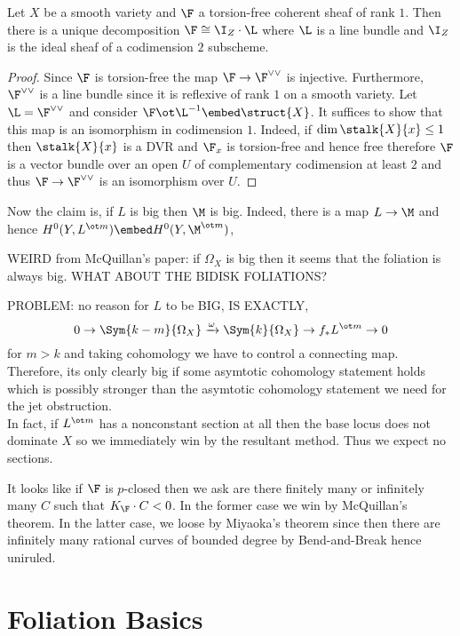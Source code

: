 \documentclass[12pt]{article}
\begin{document}
\begin{lemma}
Let $X$ be a smooth variety and $\F$ a torsion-free coherent sheaf of rank $1$. Then there is a unique decomposition $\F \cong \I_Z \cdot \L$ where $\L$ is a line bundle and $\I_Z$ is the ideal sheaf of a codimension $2$ subscheme.
\end{lemma}

\begin{proof}
Since $\F$ is torsion-free the map $\F \to \F^{\vee \vee}$ is injective. Furthermore, $\F^{\vee \vee}$ is a line bundle since it is reflexive of rank $1$ on a smooth variety. Let $\L = \F^{\vee \vee}$ and consider $\F \ot \L^{-1} \embed \struct{X}$. It suffices to show that this map is an isomorphism in codimension $1$. Indeed, if $\dim{\stalk{X}{x}} \le 1$ then $\stalk{X}{x}$ is a DVR and $\F_x$ is torsion-free and hence free therefore $\F$ is a vector bundle over an open $U$ of complementary codimension at least $2$ and thus $\F \to \F^{\vee \vee}$ is an isomorphism over $U$. 
\end{proof}


Now the claim is, if $L$ is big then $\M$ is big. Indeed, there is a map $L \to \M$ and hence $H^0(Y, L^{\ot m}) \embed H^0(Y, \M^{\ot m})$, 


WEIRD from McQuillan's paper: if $\Omega_X$ is big then it seems that the foliation is always big. WHAT ABOUT THE BIDISK FOLIATIONS?

PROBLEM: no reason for $L$ to be BIG, IS EXACTLY,
\[ 0 \to \Sym{k-m}{\Omega_X} \xrightarrow{\omega} \Sym{k}{\Omega_X} \to f_* L^{\ot m} \to 0 \]
for $m > k$ and taking cohomology we have to control a connecting map. Therefore, its only clearly big if some asymtotic cohomology statement holds which is possibly stronger than the asymtotic cohomology statement we need for the jet obstruction. 
\bigskip\\
In fact, if $L^{\ot m}$ has a nonconstant section at all then the base locus does not dominate $X$ so we immediately win by the resultant method. Thus we expect no sections. 


It looks like if $\F$ is $p$-closed then we ask are there finitely many or infinitely many $C$ such that $K_{\F} \cdot C < 0$. In the former case we win by McQuillan's theorem. In the latter case, we loose by Miyaoka's theorem since then there are infinitely many rational curves of bounded degree by Bend-and-Break hence uniruled. 

\section{Foliation Basics}
\end{document}
